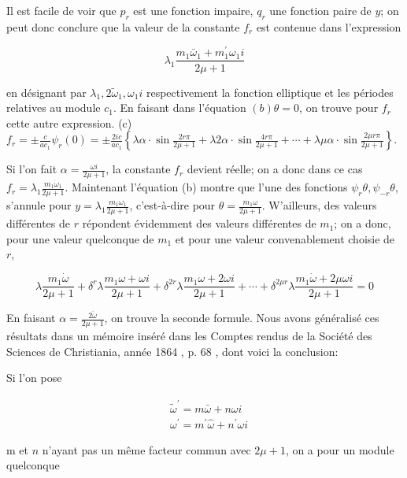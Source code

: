 \documentclass{article}
\begin{document}
Il est facile de voir que \(p_{r}\) est une fonction impaire, \(q_{r}\) une fonction paire de \(y\); on peut donc conclure que la valeur de la constante \(f_{r}\) est contenue dans l'expression

\[
\lambda_{1} \frac{m_{1} \bar{\omega}_{1}+m_{1}^{\prime} \omega_{1} i}{2 \mu+1}
\]

en désignant par \(\lambda_{1}, 2 \tilde{\omega}_{1}, \omega_{1} i\) respectivement la fonction elliptique et les périodes relatives au module \(c_{1}\). En faisant dans l'équation \((b) \theta=0\), on trouve pour \(f_{r}\) cette autre expression.
(c) \(f_{r}= \pm \frac{c}{a c_{1}} \psi_{r}(0)= \pm \frac{2 i c}{a c_{1}}\left\{\lambda \alpha \cdot \sin \frac{2 r \pi}{2 \mu+1}+\lambda 2 \alpha \cdot \sin \frac{4 r \pi}{2 \mu+1}+\cdots+\lambda \mu \alpha \cdot \sin \frac{2 \mu r \pi}{2 \mu+1}\right\}\).

Si l'on fait \(\alpha=\frac{\omega i}{2 \mu+1}\), la constante \(f_{r}\) devient réelle; on a donc dans ce cas \(f_{r}=\lambda_{1} \frac{m_{1} \dot{\omega}_{1}}{2 \mu+1}\). Maintenant l'équation (b) montre que l'une des fonctions \(\psi_{r} \theta, \psi_{-r} \theta\), s'annule pour \(y=\lambda_{1} \frac{m_{1} \omega_{1}}{2 \mu+1}\), c'est-à-dire pour \(\theta=\frac{m_{1} \omega}{2 \mu+1}\). W'ailleurs, des valeurs différentes de \(r\) répondent évidemment des valeurs différentes de \(m_{1}\); on a donc, pour une valeur quelconque de \(m_{1}\) et pour une valeur convenablement choisie de \(r\),

\[
\lambda \frac{m_{1} \dot{\omega}}{2 \mu+1}+\delta^{r} \lambda \frac{m_{1} \omega+\omega i}{2 \mu+1}+\delta^{2 r} \lambda \frac{m_{1} \omega+2 \omega i}{2 \mu+1}+\cdots+\delta^{2 \mu r} \lambda \frac{m_{1} \dot{\omega}+2 \mu \omega i}{2 \mu+1}=0
\]

En faisant \(\alpha=\frac{2 \grave{\omega}}{2 \mu+1}\), on trouve la seconde formule. Nous avons généralisé ces résultats dans un mémoire inséré dans les Comptes rendus de la Société des Sciences de Christiania, année 1864 , p. 68 , dont voici la conclusion:

Si l'on pose

\[
\begin{aligned}
& \tilde{\omega}^{\prime}=m \bar{\omega}+n \omega i \\
& \omega^{\prime}=m^{\prime} \hat{\omega}+n^{\prime} \omega i
\end{aligned}
\]

m et \(n\) n'ayant pas un même facteur commun avec \(2 \mu+1\), on a pour un module quelconque
\end{document}
